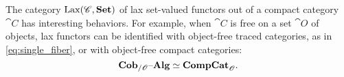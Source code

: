 \documentclass[12pt,oneside,article,draft]{memoir}
\begin{document}
The category $\operatorname{Lax}(\mathscr{C},\mathbf{Set})$ of lax set-valued functors out of a compact category $\cat{C}$ has interesting behaviors. For example, when $\cat{C}$ is free on a set $\cat{O}$ of objects, lax functors can be identified with object-free traced categories, as in \eqref{eq:single_fiber}, or with object-free compact categories:
\begin{equation*}
 \mathbf{Cob}_{/\mathscr{O}}{\text \textendash}\mathbf{Alg}\simeq\mathbf{CompCat}_{\mathscr{O}}.
\end{equation*}

%
%
%
\end{document}
